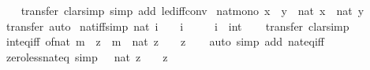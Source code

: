 \begin{isabellebody}
%
\isadelimproof
\ \ %
\endisadelimproof
%
\isatagproof
{}\isamarkupfalse%
\ transfer\ {\isacharparenleft}{\kern0pt}clarsimp\ simp\ add{\isacharcolon}{\kern0pt}\ le{\isacharunderscore}{\kern0pt}diff{\isacharunderscore}{\kern0pt}conv{\isacharparenright}{\kern0pt}%
\endisatagproof
{\isafoldproof}%
%
\isadelimproof
\isanewline
%
\endisadelimproof
\isanewline
{}\isamarkupfalse%
\ nat{\isacharunderscore}{\kern0pt}mono{\isacharcolon}{\kern0pt}\ {\isachardoublequoteopen}x\ {\isasymle}\ y\ {\isasymLongrightarrow}\ nat\ x\ {\isasymle}\ nat\ y{\isachardoublequoteclose}\isanewline
%
\isadelimproof
\ \ %
\endisadelimproof
%
\isatagproof
{}\isamarkupfalse%
\ transfer\ auto%
\endisatagproof
{\isafoldproof}%
%
\isadelimproof
\isanewline
%
\endisadelimproof
\isanewline
{}\isamarkupfalse%
\ nat{\isacharunderscore}{\kern0pt}{}{\isacharunderscore}{\kern0pt}iff{\isacharbrackleft}{\kern0pt}simp{\isacharbrackright}{\kern0pt}{\isacharcolon}{\kern0pt}\ {\isachardoublequoteopen}nat\ i\ {\isacharequal}{\kern0pt}\ {}\ {\isasymlongleftrightarrow}\ i\ {\isasymle}\ {}{\isachardoublequoteclose}\isanewline
\ \ \ i\ {\isacharcolon}{\kern0pt}{\isacharcolon}{\kern0pt}\ int\isanewline
%
\isadelimproof
\ \ %
\endisadelimproof
%
\isatagproof
{}\isamarkupfalse%
\ transfer\ clarsimp%
\endisatagproof
{\isafoldproof}%
%
\isadelimproof
\isanewline
%
\endisadelimproof
\isanewline
{}\isamarkupfalse%
\ int{\isacharunderscore}{\kern0pt}eq{\isacharunderscore}{\kern0pt}iff{\isacharcolon}{\kern0pt}\ {\isachardoublequoteopen}of{\isacharunderscore}{\kern0pt}nat\ m\ {\isacharequal}{\kern0pt}\ z\ {\isasymlongleftrightarrow}\ m\ {\isacharequal}{\kern0pt}\ nat\ z\ {\isasymand}\ {}\ {\isasymle}\ z{\isachardoublequoteclose}\isanewline
%
\isadelimproof
\ \ %
\endisadelimproof
%
\isatagproof
{}\isamarkupfalse%
\ {\isacharparenleft}{\kern0pt}auto\ simp\ add{\isacharcolon}{\kern0pt}\ nat{\isacharunderscore}{\kern0pt}eq{\isacharunderscore}{\kern0pt}iff{}{\isacharparenright}{\kern0pt}%
\endisatagproof
{\isafoldproof}%
%
\isadelimproof
\isanewline
%
\endisadelimproof
\isanewline
{}\isamarkupfalse%
\ zero{\isacharunderscore}{\kern0pt}less{\isacharunderscore}{\kern0pt}nat{\isacharunderscore}{\kern0pt}eq\ {\isacharbrackleft}{\kern0pt}simp{\isacharbrackright}{\kern0pt}{\isacharcolon}{\kern0pt}\ {\isachardoublequoteopen}{}\ {\isacharless}{\kern0pt}\ nat\ z\ {\isasymlongleftrightarrow}\ {}\ {\isacharless}{\kern0pt}\ z{\isachardoublequoteclose}\isanewline

\end{isabellebody}
